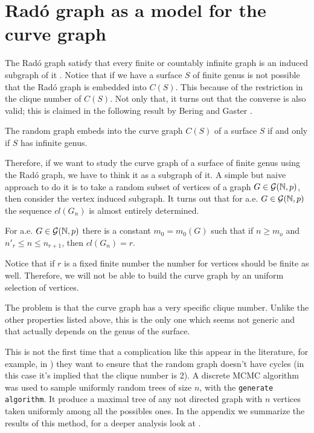 \section{Radó graph as a model for the curve graph}
The Radó graph satisfy that every finite or countably infinite graph is an induced subgraph of it \cite{DarReferenciaAqui1}. Notice that if we have a surface $S$ of finite genus is not possible that the Radó graph is embedded into $C(S)$. This because of the restriction in the clique number of $C(S)$. Not only that, it turns out that the converse is also valid; this is claimed in the following result by Bering and Gaster \cite{beringGaster}.

\begin{theorem}
The random graph embeds into the curve graph $C(S)$ of a surface $S$ if and only if $S$ has infinite genus.
\end{theorem}

Therefore, if we want to study the curve graph of a surface of finite genus using the Radó graph, we have to think it as a subgraph of it. A simple but naive approach to do it is to take a random subset of vertices of a graph $G\in \mathcal{G}(\mathbb{N}, p)$, then consider the vertex induced subgraph. It turns out that for a.e. $G\in \mathcal{G}(\mathbb{N}, p)$ the sequence $cl(G_n)$ is almost entirely determined.

\begin{theorem}
For a.e. $G \in \mathcal{G}(\mathbb{N},p)$ there is a constant $m_0 = m_{0}(G)$ such that if $n \geq m_o$ and $n'_{r} \leq n \leq n_{r+1}$, then $cl(G_{n}) = r$.
\end{theorem}

Notice that if $r$ is a fixed finite number the number for vertices should be finite as well. Therefore, we will not be able to build the curve graph by an uniform selection of vertices. 

The problem is that the curve graph has a very specific clique number. Unlike the other properties listed above, this is the only one which seems not generic and that actually depends on the genus of the surface.

This is not the first time that a complication like this appear in the literature, for example, in \cite{Alcazar15}) they want to ensure that the random graph doesn't have cycles (in this case it's implied that the clique number is 2). A discrete MCMC algorithm was used to sample uniformly random trees of size $n$, with the \texttt{generate algorithm}. It produce a maximal tree of any not directed graph with $n$ vertices taken uniformly among all the possibles ones. In the appendix we summarize the results of this method, for a deeper analysis look at \cite{Broder89}.

